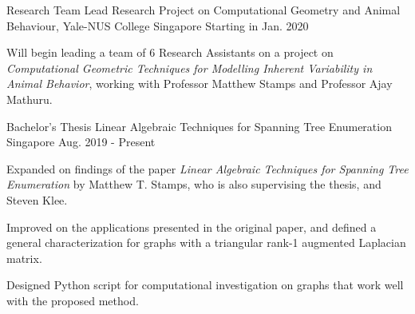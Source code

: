 

\begin{cventries}

  \cventry
  {Research Team Lead} %
  {Research Project on Computational Geometry and Animal Behaviour, Yale-NUS College} %
  {Singapore} %
  {Starting in Jan. 2020} %
  {
    \begin{cvitems} %
    \item {Will begin leading a team of 6 Research Assistants on a project on
        \textit{Computational Geometric Techniques for Modelling Inherent Variability
        in Animal Behavior}, working with Professor Matthew Stamps and
        Professor Ajay Mathuru.}
    \end{cvitems}
  }
    
  \cventry
  {Bachelor's Thesis} %
  {Linear Algebraic Techniques for Spanning Tree Enumeration} %
  {Singapore} %
  {Aug. 2019 - Present} %
  {
    \begin{cvitems} %
    \item {Expanded on findings of the paper \textit{Linear Algebraic Techniques
          for Spanning Tree Enumeration} by Matthew T. Stamps, who is also
        supervising the thesis, and Steven Klee.}
    \item {Improved on the applications presented in the original paper, and
        defined a general characterization for graphs with a triangular rank-1
        augmented Laplacian matrix.}
    \item {Designed Python script for computational investigation on graphs that
        work well with the proposed method.}
    \end{cvitems}
  }
  

\end{cventries}
